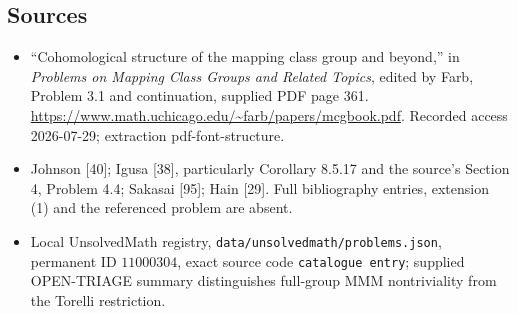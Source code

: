 \documentclass[11pt]{article}
\begin{document}
\subsection{Sources}
\begin{itemize}
\item ``Cohomological structure of the mapping class group and beyond,'' in \emph{Problems on Mapping Class Groups and Related Topics}, edited by Farb, Problem 3.1 and continuation, supplied PDF page 361. \url{https://www.math.uchicago.edu/~farb/papers/mcgbook.pdf}. Recorded access 2026-07-29; extraction pdf-font-structure.
\item Johnson [40]; Igusa [38], particularly Corollary 8.5.17 and the source's Section 4, Problem 4.4; Sakasai [95]; Hain [29]. Full bibliography entries, extension (1) and the referenced problem are absent.
\item Local UnsolvedMath registry, \texttt{data/unsolvedmath/problems.json}, permanent ID \(11000304\), exact source code \texttt{catalogue entry}; supplied OPEN-TRIAGE summary distinguishes full-group MMM nontriviality from the Torelli restriction.
\end{itemize}
\end{document}
